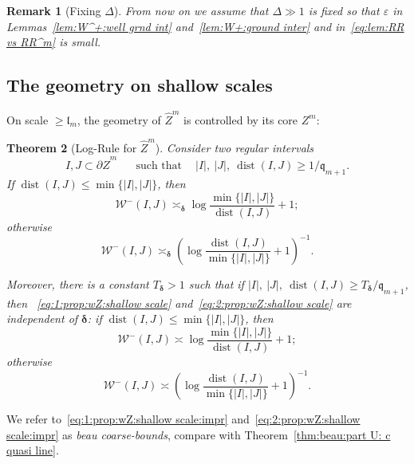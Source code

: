 \documentclass{amsart}
\renewcommand{\sp}{{\ \ }}
\newcommand{\1}{{\mathbb 1 }}
\newcommand{\Width}{{\mathcal W}}
\newcommand{\bDelta}{{\mathbb{\Delta}}}
\newcommand{\wZ}{{\widehat Z}}
\newcommand{\qq}{\mathfrak{q}}
\newcommand{\length}{{\mathfrak l}}
\newtheorem{thm}{Theorem}[section]
\newtheorem{rem}[thm]{Remark}
\theoremstyle{remark}
\numberwithin{equation}{section}
\theoremstyle{definition}
\newcommand{\dist}{\operatorname{dist}}
\newcommand{\bdelta}{{\boldsymbol{ \delta}}}
\begin{document}
\begin{rem}[Fixing $\bDelta$]
\label{rem:fix bDelta}
From now on we assume that $\bDelta\gg 1$ is fixed so that $\varepsilon$ in Lemmas~\ref{lem:W^+:well grnd int} and~\ref{lem:W+:ground inter}  and in~\eqref{eq:lem:RR vs RR^m} is small.
\end{rem}


\subsection{The geometry on shallow scales} On scale $\ge \length_m$, the geometry of $\wZ^m$  is controlled by its core $Z^m$:

\begin{thm}[Log-Rule for $\wZ^m$]
\label{thm:wZ:shallow scale}
Consider two regular intervals \[I,J\subset \partial \wZ^m\sp\sp\sp\text{ such that }\sp\sp |I|,\ |J|,\ \dist(I,J) \ge 1/\qq_{m+1} .\] If $\dist (I,J)\le \min\{|I|,|J|\}$, then
\begin{equation}
\label{eq:1:prop:wZ:shallow scale}
\Width^-(I,J) \asymp_\bdelta \log \frac{\min\{|I|,|J|\}}{\dist (I,J)} +1;
\end{equation}
otherwise 
\begin{equation}
\label{eq:2:prop:wZ:shallow scale}
\Width^-(I,J) \asymp_\bdelta \left( \log \frac{\dist (I,J)}{\min\{|I|,|J|\}} +1\right)^{-1}.
\end{equation} 

Moreover, there is a constant $T_\bdelta>1$ such that if $|I|,\ |J|,\ \dist(I,J) \ge T_\bdelta/\qq_{m+1}$, then ~\eqref{eq:1:prop:wZ:shallow scale} and~\eqref{eq:2:prop:wZ:shallow scale} are independent of $\bdelta$: if $\dist (I,J)\le \min\{|I|,|J|\}$, then
\begin{equation}
\label{eq:1:prop:wZ:shallow scale:impr}
\Width^-(I,J) \asymp \log \frac{\min\{|I|,|J|\}}{\dist (I,J)} +1;
\end{equation}
otherwise 
\begin{equation}
\label{eq:2:prop:wZ:shallow scale:impr}
\Width^-(I,J) \asymp \left( \log \frac{\dist (I,J)}{\min\{|I|,|J|\}} +1\right)^{-1}.
\end{equation} 
 \end{thm}

We refer to~\eqref{eq:1:prop:wZ:shallow scale:impr} and~\eqref{eq:2:prop:wZ:shallow scale:impr} as \emph{beau coarse-bounds}, compare with Theorem~\ref{thm:beau:part U: c quasi line}.  
 
\end{document}
